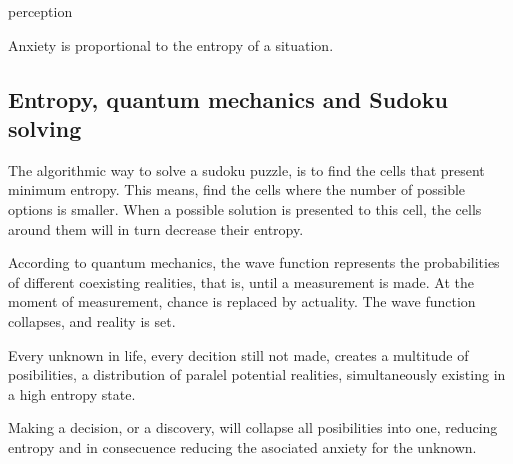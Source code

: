 
\begin{center}
\vspace*{\fill}
\Huge{perception}

\vspace{2cm}

\begin{flushright}
\large{
\textit{ \propto {}}}
\end{flushright}

\vspace*{\fill}
\end{center}



Anxiety is proportional to the entropy of a situation. 


\subsection*{ Entropy, quantum mechanics and Sudoku solving} 

The algorithmic way to solve a sudoku puzzle, is to find the cells 
that present minimum entropy. 
This means, find the cells where the number of possible options is smaller.
When a possible solution is presented to this cell, the cells around them will 
in turn decrease their entropy. 

According to quantum mechanics, the wave function represents the probabilities 
of different coexisting realities, that is, until a 
measurement is made. At the moment of measurement, chance is replaced by 
actuality. The wave function collapses, and reality is set.

Every unknown in life, every decition still not made, creates a multitude of 
posibilities, a distribution of paralel potential realities, simultaneously 
existing in a high entropy state. 

Making a decision, or a discovery, will collapse all posibilities into one, 
reducing entropy and in consecuence reducing the asociated anxiety for the unknown. 







